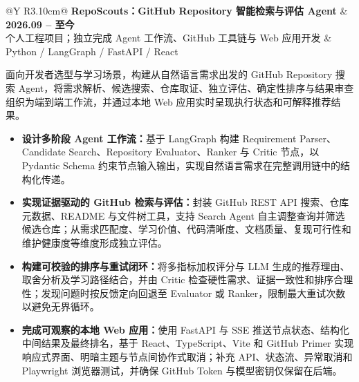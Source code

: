 \documentclass[10pt,a4paper]{article}
\makeatletter
\newenvironment{cvitems}{
  \begin{itemize}[
    leftmargin=1.30em,
    label=\textcolor{Accent}{
      \raisebox{0.15ex}{\scriptsize\textbullet}
    },
    topsep=0.6pt,
    itemsep=1.1pt,
    parsep=0pt,
    partopsep=0pt
  ]
  \justifying
}{
  \end{itemize}
}
\newcommand{\researchentry}[5]{
  \Needspace{2.8\baselineskip}

  \begin{tabularx}{\textwidth}{@{}Y R{3.10cm}@{}}
    {\bfseries #1}
    &
    {\bfseries #4}
    \\[-0.3pt]

    {\color{Muted}#2}
    &
    {\color{Muted}#3}
  \end{tabularx}

  \vspace{-1.3pt}

  #5

  \vspace{0.2pt}
}
\makeatother
\begin{document}
\researchentry
{RepoScouts：GitHub Repository 智能检索与评估 Agent}
{个人工程项目；独立完成 Agent 工作流、GitHub 工具链与 Web 应用开发}
{Python / LangGraph / FastAPI / React}
{2026.09 -- 至今}
{
面向开发者选型与学习场景，构建从自然语言需求出发的 GitHub Repository 搜索 Agent，将需求解析、候选搜索、仓库取证、独立评估、确定性排序与结果审查组织为端到端工作流，并通过本地 Web 应用实时呈现执行状态和可解释推荐结果。

\begin{cvitems}

  \item \textbf{设计多阶段 Agent 工作流：}基于 LangGraph 构建 Requirement Parser、Candidate Search、Repository Evaluator、Ranker 与 Critic 节点，以 Pydantic Schema 约束节点输入输出，实现自然语言需求在完整调用链中的结构化传递。

  \item \textbf{实现证据驱动的 GitHub 检索与评估：}封装 GitHub REST API 搜索、仓库元数据、README 与文件树工具，支持 Search Agent 自主调整查询并筛选候选仓库；从需求匹配度、学习价值、代码清晰度、文档质量、复现可行性和维护健康度等维度形成独立评估。

  \item \textbf{构建可校验的排序与重试闭环：}将多指标加权评分与 LLM 生成的推荐理由、取舍分析及学习路径结合，并由 Critic 检查硬性需求、证据一致性和排序合理性；发现问题时按反馈定向回退至 Evaluator 或 Ranker，限制最大重试次数以避免无界循环。

  \item \textbf{完成可观察的本地 Web 应用：}使用 FastAPI 与 SSE 推送节点状态、结构化中间结果及最终排名，基于 React、TypeScript、Vite 和 GitHub Primer 实现响应式界面、明暗主题与节点间协作式取消；补充 API、状态流、异常取消和 Playwright 浏览器测试，并确保 GitHub Token 与模型密钥仅保留在后端。

\end{cvitems}

}
\end{document}
